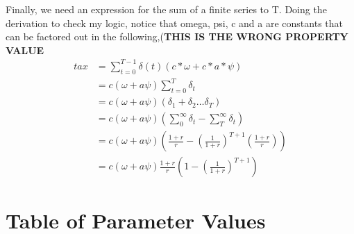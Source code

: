 Finally, we need an expression for the sum of a finite  series to T.  Doing the derivation to check my logic, notice that  omega, psi, c  and a are constants that can be factored out in the following,(\textbf{THIS IS THE WRONG PROPERTY VALUE}
\begin{align}%
    tax&= \sum_{t=0}^{T-1} \delta(t) \left(c*\omega + c*a*\psi \right)\\
        &= c(\omega + a\psi)\sum_{t=0}^T  \delta_t\\
        &= c(\omega + a\psi)(\delta_1+\delta_2 \dots \delta_T)\\
        &= c(\omega + a\psi) \left(\sum_0^\infty \delta_t-\sum_{T}^\infty \delta_t\right)\\
        &= c(\omega + a\psi) \left(\frac{1+r}{r}  - \left(\frac{1}{1+r}\right)^{T+1} \left(\frac{1+r}{r} \right) \right)\\
        &= c(\omega + a\psi) \frac{1+r}{r}\left(1  - \left(\frac{1}{1+r}\right)^{T+1} \right)
\end{align}








\section{Table of Parameter Values}

